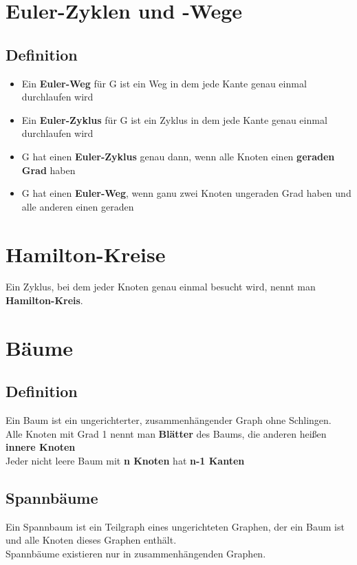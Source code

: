 \documentclass{scrreprt}
\begin{document}
\section{Euler-Zyklen und -Wege}
\subsection{Definition}
\begin{itemize}
    \item Ein \textbf{Euler-Weg} für G ist ein Weg in dem jede Kante genau einmal durchlaufen wird
    \item Ein \textbf{Euler-Zyklus} für G ist ein Zyklus in dem jede Kante genau einmal durchlaufen wird
    \item G hat einen \textbf{Euler-Zyklus} genau dann, wenn alle Knoten einen \textbf{geraden Grad} haben
    \item G hat einen \textbf{Euler-Weg}, wenn ganu zwei Knoten ungeraden Grad haben und alle anderen einen geraden
\end{itemize}
\section{Hamilton-Kreise}
Ein Zyklus, bei dem jeder Knoten genau einmal besucht wird, nennt man \textbf{Hamilton-Kreis}.
\section{Bäume}
\subsection{Definition}
Ein Baum ist ein ungerichterter, zusammenhängender Graph ohne Schlingen.
\\Alle Knoten mit Grad 1 nennt man \textbf{Blätter} des Baums, die anderen heißen \textbf{innere Knoten}
\\Jeder nicht leere Baum mit \textbf{n Knoten} hat \textbf{n-1 Kanten}
\subsection{Spannbäume}
Ein Spannbaum ist ein Teilgraph eines ungerichteten Graphen, der ein Baum ist und alle Knoten dieses Graphen enthält.
\\Spannbäume existieren nur in zusammenhängenden Graphen.
\end{document}
